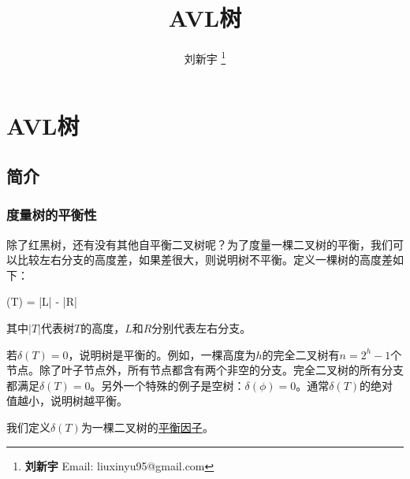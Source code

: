 \documentclass[UTF8]{article}
\begin{document}


\title{AVL树}

\author{刘新宇
\thanks{{\bfseries 刘新宇} \newline
  Email: liuxinyu95@gmail.com \newline}
  }

\maketitle
\fi


\ifx\wholebook\relax
\chapter{AVL树}
\fi

\section{简介}
\label{introduction} 

\subsection{度量树的平衡性}

除了红黑树，还有没有其他自平衡二叉树呢？为了度量一棵二叉树的平衡，我们可以比较左右分支的高度差，如果差很大，则说明树不平衡。定义一棵树的高度差如下：

\be
  \delta(T) = |L| - |R|
\ee

其中$|T|$代表树$T$的高度，$L$和$R$分别代表左右分支。

若$\delta(T) = 0$，说明树是平衡的。例如，一棵高度为$h$的完全二叉树有$n = 2^h-1$个节点。除了叶子节点外，所有节点都含有两个非空的分支。完全二叉树的所有分支都满足$\delta(T)=0$。另外一个特殊的例子是空树：$\delta(\phi) = 0$。通常$\delta(T)$的绝对值越小，说明树越平衡。

我们定义$\delta(T)$为一棵二叉树的\underline{平衡因子}。

\end{document}
